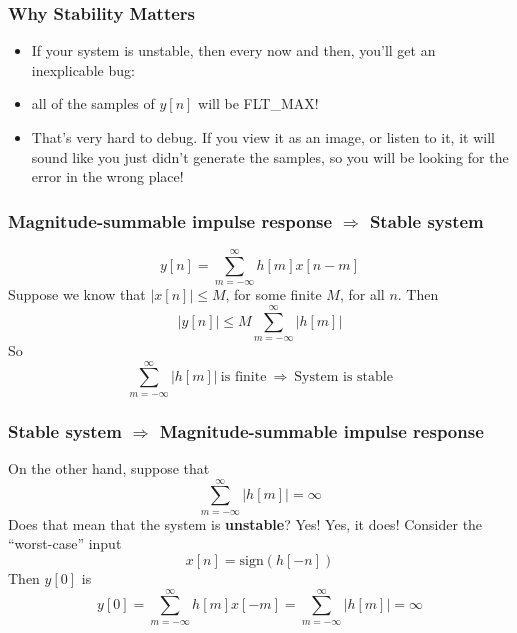 \documentclass{beamer}
\begin{document}
\begin{frame}
  \frametitle{Why Stability Matters}

  \begin{itemize}
  \item If your system is unstable, then every now and then, you'll
    get an inexplicable bug:
  \item all of the samples of $y[n]$ will be FLT\_MAX!
  \item That's very hard to debug.  If you view it as an image, or
    listen to it, it will sound like you just didn't generate the
    samples, so you will be looking for the error in the wrong place!
  \end{itemize}
    
\end{frame}

\begin{frame}
  \frametitle{Magnitude-summable impulse response $\Rightarrow$ Stable system}

  \begin{displaymath}
    y[n] = \sum_{m=-\infty}^\infty h[m] x[n-m]
  \end{displaymath}
  Suppose we know that $|x[n]|\le M$, for some finite $M$, for all $n$.  Then
  \begin{displaymath}
    |y[n]| \le  M \sum_{m=-\infty}^\infty |h[m]|
  \end{displaymath}
  So
  \begin{displaymath}
    \sum_{m=-\infty}^\infty |h[m]|~\mbox{is finite}~\Rightarrow~\mbox{System is stable}
  \end{displaymath}
\end{frame}

\begin{frame}
  \frametitle{Stable system $\Rightarrow$ Magnitude-summable impulse response}

  On the other hand, suppose that 
  \begin{displaymath}
    \sum_{m=-\infty}^\infty |h[m]|=\infty
  \end{displaymath}
  Does that mean that the system is {\bf unstable}?  Yes!  Yes, it
  does!  Consider the ``worst-case'' input
  \begin{displaymath}
    x[n] = \mbox{sign}\left(h[-n]\right)
  \end{displaymath}
  Then $y[0]$ is
  \begin{displaymath}
    y[0] = \sum_{m=-\infty}^\infty h[m] x[-m] = \sum_{m=-\infty}^\infty |h[m]|=\infty
  \end{displaymath}
\end{frame}
\end{document}
